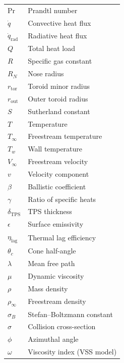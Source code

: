 \begin{center}
\begin{tabularx}{0.8\textwidth} { 
   >{\raggedright\arraybackslash}X 
   >{\raggedright\arraybackslash}X}
    $\text{Pr}$ & Prandtl number                        \\
    $\dot{q}$   & Convective heat flux                  \\
    $\dot{q}_{\text{rad}}$ & Radiative heat flux        \\
    $Q$         & Total heat load                       \\
    $R$         & Specific gas constant                 \\
    $R_N$       & Nose radius                           \\
    $r_{\text{tor}}$ & Toroid minor radius              \\
    $r_{\text{out}}$ & Outer toroid radius              \\
    $S$         & Sutherland constant                   \\
    $T$         & Temperature                           \\
    $T_\infty$  & Freestream temperature                \\
    $T_w$       & Wall temperature                      \\
    $V_\infty$  & Freestream velocity                   \\
    $v$         & Velocity component                    \\
    $\beta$     & Ballistic coefficient                 \\
    $\gamma$    & Ratio of specific heats               \\
    $\delta_{\text{TPS}}$ & TPS thickness               \\
    $\epsilon$  & Surface emissivity                    \\
    $\eta_{\text{lag}}$ & Thermal lag efficiency         \\
    $\theta_c$  & Cone half-angle                       \\
    $\lambda$   & Mean free path                        \\
    $\mu$       & Dynamic viscosity                     \\
    $\rho$      & Mass density                          \\
    $\rho_\infty$ & Freestream density                  \\
    $\sigma_B$  & Stefan--Boltzmann constant            \\
    $\sigma$    & Collision cross-section               \\
    $\phi$      & Azimuthal angle                       \\
    $\omega$    & Viscosity index (VSS model)           \\
    \hline
\end{tabularx}
\end{center}
